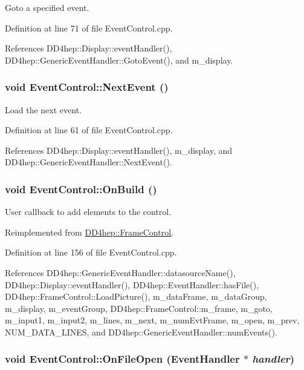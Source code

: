 Goto a specified event. 

Definition at line 71 of file EventControl.cpp.

References DD4hep::Display::eventHandler(), DD4hep::GenericEventHandler::GotoEvent(), and m\_\-display.\hypertarget{class_d_d4hep_1_1_event_control_ac176e09a639beea7cc010b5f66b7b129}{
\subsubsection[{NextEvent}]{\setlength{\rightskip}{0pt plus 5cm}void EventControl::NextEvent ()}}
\label{class_d_d4hep_1_1_event_control_ac176e09a639beea7cc010b5f66b7b129}


Load the next event. 

Definition at line 61 of file EventControl.cpp.

References DD4hep::Display::eventHandler(), m\_\-display, and DD4hep::GenericEventHandler::NextEvent().\hypertarget{class_d_d4hep_1_1_event_control_ada9bb8f5e290f6acb6832208f407a53a}{
\subsubsection[{OnBuild}]{\setlength{\rightskip}{0pt plus 5cm}void EventControl::OnBuild ()}}
\label{class_d_d4hep_1_1_event_control_ada9bb8f5e290f6acb6832208f407a53a}


User callback to add elements to the control. 

Reimplemented from \hyperlink{class_d_d4hep_1_1_frame_control_a934ef76420162167364133e43c7be8b5}{DD4hep::FrameControl}.

Definition at line 156 of file EventControl.cpp.

References DD4hep::GenericEventHandler::datasourceName(), DD4hep::Display::eventHandler(), DD4hep::EventHandler::hasFile(), DD4hep::FrameControl::LoadPicture(), m\_\-dataFrame, m\_\-dataGroup, m\_\-display, m\_\-eventGroup, DD4hep::FrameControl::m\_\-frame, m\_\-goto, m\_\-input1, m\_\-input2, m\_\-lines, m\_\-next, m\_\-numEvtFrame, m\_\-open, m\_\-prev, NUM\_\-DATA\_\-LINES, and DD4hep::GenericEventHandler::numEvents().\hypertarget{class_d_d4hep_1_1_event_control_a651a44af5e16dd7c9f98e3ccec5971a2}{
\subsubsection[{OnFileOpen}]{\setlength{\rightskip}{0pt plus 5cm}void EventControl::OnFileOpen ({\bf EventHandler} $\ast$ {\em handler})}}
\label{class_d_d4hep_1_1_event_control_a651a44af5e16dd7c9f98e3ccec5971a2}



